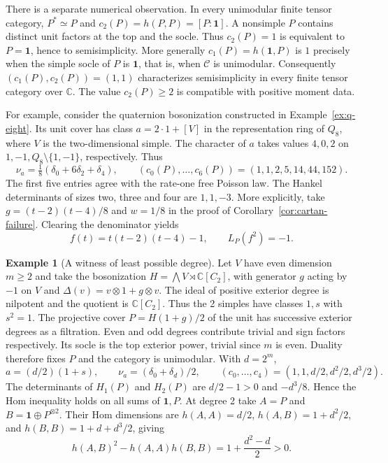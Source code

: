 \documentclass[11pt,reqno]{amsart}
\theoremstyle{definition}
\newtheorem{example}[theorem]{Example}
\newcommand{\one}{\mathbf 1}
\newcommand{\C}{\mathcal C}
\newcommand{\CC}{\mathbb C}
\begin{document}
There is a separate numerical observation. In every unimodular finite tensor category, $P^*\simeq P$ and $c_2(P)=h(P,P)=[P:\one]$. A nonsimple $P$ contains distinct unit factors at the top and the socle. Thus $c_2(P)=1$ is equivalent to $P=\one$, hence to semisimplicity. More generally $c_1(P)=h(\one,P)$ is $1$ precisely when the simple socle of $P$ is $\one$, that is, when $\C$ is unimodular. Consequently $(c_1(P),c_2(P))=(1,1)$ characterizes semisimplicity in every finite tensor category over $\CC$. The value $c_2(P)\ge2$ is compatible with positive moment data.

For example, consider the quaternion bosonization constructed in Example~\ref{ex:q-eight}. Its unit cover has class $a=2\cdot1+[V]$ in the representation ring of $Q_8$, where $V$ is the two-dimensional simple. The character of $a$ takes values $4,0,2$ on $1,-1,Q_8\setminus\{1,-1\}$, respectively. Thus
\begin{equation}\label{eq:quaternion-law}
 \nu_a=\tfrac18(\delta_0+6\delta_2+\delta_4),\qquad
 (c_0(P),\ldots,c_6(P))=(1,1,2,5,14,44,152).
\end{equation}
The first five entries agree with the rate-one free Poisson law. The Hankel determinants of sizes two, three and four are $1,1,-3$. More explicitly, take $g=(t-2)(t-4)/8$ and $w=1/8$ in the proof of Corollary~\ref{cor:cartan-failure}. Clearing the denominator yields
\[
          f(t)=t(t-2)(t-4)-1,\qquad L_P(f^2)=-1 .
\]

\begin{example}[A witness of least possible degree]\label{ex:exterior-witness}
Let $V$ have even dimension $m\ge2$ and take the bosonization
$H=\bigwedge V\rtimes\CC[C_2]$, with generator $g$ acting by $-1$ on
$V$ and $\Delta(v)=v\otimes1+g\otimes v$. The ideal of positive
exterior degree is nilpotent and the quotient is $\CC[C_2]$. Thus the
2 simples have classes $1,s$ with $s^2=1$. The projective cover
$P=H(1+g)/2$ of the unit has successive exterior degrees as a filtration.
Even and odd degrees contribute trivial and sign factors respectively.
Its socle is the top exterior power, trivial since $m$ is even.
Duality therefore fixes $P$ and the category is unimodular. With $d=2^m$,
\[
 a=(d/2)(1+s),\qquad \nu_a=(\delta_0+\delta_d)/2,\qquad
 (c_0,\ldots,c_4)=(1,1,d/2,d^2/2,d^3/2).
\]
The determinants of $H_1(P)$ and $H_2(P)$ are $d/2-1>0$ and $-d^3/8$.
Hence the Hom inequality holds on all sums of $\one,P$. At degree 2
take $A=P$ and $B=\one\oplus P^{\otimes2}$. Their Hom dimensions are
$h(A,A)=d/2$, $h(A,B)=1+d^2/2$, and $h(B,B)=1+d+d^3/2$, giving
\[
                h(A,B)^2-h(A,A)h(B,B)=1+\frac{d^2-d}{2}>0.
\]
\end{example}
\end{document}
